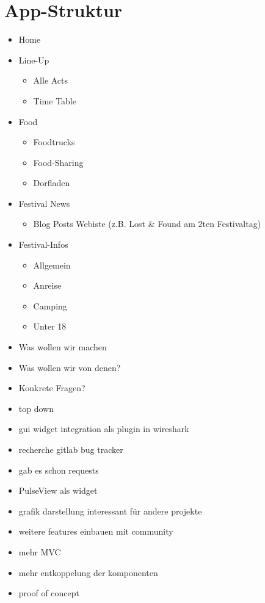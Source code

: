\documentclass[a4paper,12pt,
headsepline,           %
oneside,               %
pointlessnumbers,      %
bibtotoc,              %
BCOR15mm               %
]{scrbook}
\begin{document}
\section*{App-Struktur}
\begin{itemize}
  \item Home
  \item Line-Up
  \begin{itemize}
    \item Alle Acts
    \item Time Table
  \end{itemize}
  \item Food
  \begin{itemize}
    \item Foodtrucks
    \item Food-Sharing
    \item Dorfladen
  \end{itemize}
  \item Festival News
  \begin{itemize}
    \item Blog Posts Webiste (z.B. Lost \& Found am 2ten Festivaltag)
  \end{itemize}
  \item Festival-Infos
  \begin{itemize}
    \item Allgemein
    \item Anreise
    \item Camping
    \item Unter 18
  \end{itemize}
\end{itemize}

\begin{itemize}
  \item Was wollen wir machen
  \item Was wollen wir von denen?
  \item Konkrete Fragen?
  \item top down
  \item gui widget integration als plugin in wireshark
  \item recherche gitlab bug tracker
  \item gab es schon requests
  \item PulseView als widget
  \item grafik darstellung interessant für andere projekte
  \item weitere features einbauen mit community
  \item mehr MVC
  \item mehr entkoppelung der komponenten
  \item proof of concept
\end{itemize}
\end{document}
